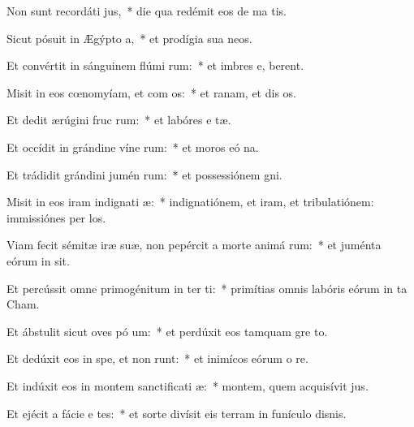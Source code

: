 \item Non sunt recordáti  jus,~* die qua redémit eos de ma tis.
\item Sicut pósuit in Ægýpto  a,~* et prodígia sua   neos.
\item Et convértit in sánguinem flúmi rum:~* et imbres e,  berent.
\item Misit in eos cœnomyíam, et com os:~* et ranam, et dis os.
\item Et dedit ærúgini fruc rum:~* et labóres e tæ.
\item Et occídit in grándine víne rum:~* et moros eó  na.
\item Et trádidit grándini jumén rum:~* et possessiónem  gni.
\item Misit in eos iram indignati æ:~* indignatiónem, et iram, et tribulatiónem: immissiónes per  los.
\item Viam fecit sémitæ iræ suæ, non pepércit a morte animá rum:~* et juménta eórum in  sit.
\item Et percússit omne primogénitum in ter ti:~* primítias omnis labóris eórum in ta Cham.
\item Et ábstulit sicut oves pó um:~* et perdúxit eos tamquam gre  to.
\item Et dedúxit eos in spe, et non runt:~* et inimícos eórum o re.
\item Et indúxit eos in montem sanctificati æ:~* montem, quem acquisívit  jus.
\item Et ejécit a fácie e tes:~* et sorte divísit eis terram in funículo disnis.
